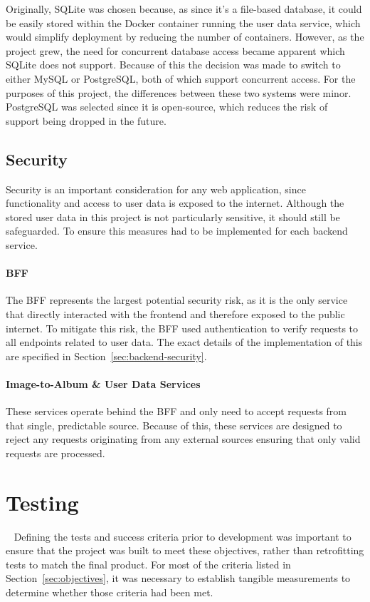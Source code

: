 Originally, SQLite was chosen because, as since it's a file-based database, it could be easily stored within the Docker container running the user data service, which would simplify deployment by reducing the number of containers. However, as the project grew, the need for concurrent database access became apparent which SQLite does not support. Because of this the decision was made to switch to either MySQL or PostgreSQL, both of which support concurrent access. For the purposes of this project, the differences between these two systems were minor. PostgreSQL was selected since it is open-source, which reduces the risk of support being dropped in the future.

\subsection{Security}
Security is an important consideration for any web application, since functionality and access to user data is exposed to the internet. Although the stored user data in this project is not particularly sensitive, it should still be safeguarded. To ensure this measures had to be implemented for each backend service.

\paragraph{BFF} The BFF represents the largest potential security risk, as it is the only service that directly interacted with the frontend and therefore exposed to the public internet. To mitigate this risk, the BFF used authentication to verify requests to all endpoints related to user data. The exact details of the implementation of this are specified in Section~\ref{sec:backend-security}.

\paragraph{Image-to-Album \& User Data Services} These services operate behind the BFF and only need to accept requests from that single, predictable source. Because of this, these services are designed to reject any requests originating from any external sources ensuring that only valid requests are processed.

\section{Testing}~\label{sec:test-design}
Defining the tests and success criteria prior to development was important to ensure that the project was built to meet these objectives, rather than retrofitting tests to match the final product. For most of the criteria listed in Section~\ref{sec:objectives}, it was necessary to establish tangible measurements to determine whether those criteria had been met.

